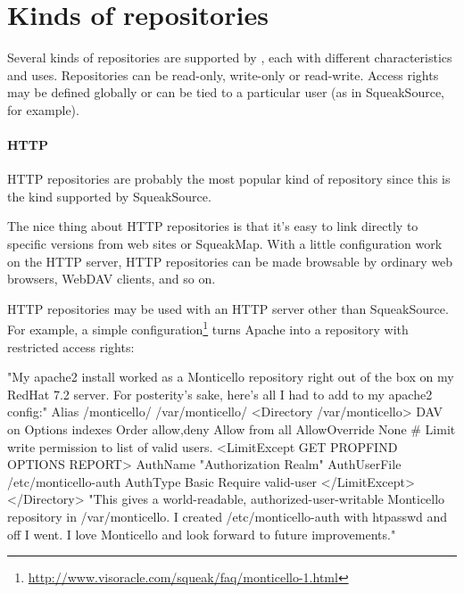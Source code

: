 \documentclass[a4paper,10pt,twoside]{book}
\begin{document}

\section{Kinds of repositories}

Several kinds of repositories are supported by \MC, each with different characteristics and uses. Repositories can be read-only, write-only or read-write. Access rights may be defined globally or can be tied to a particular user (as in SqueakSource, for example).

\paragraph{HTTP} HTTP repositories are probably the most popular kind of repository since this is the kind supported by SqueakSource. %

The nice thing about HTTP repositories is that it's easy to link directly to specific versions from web sites or SqueakMap. With a little configuration work on the HTTP server, HTTP repositories can be made browsable by ordinary web browsers, WebDAV clients, and so on.

HTTP repositories may be used with an HTTP server other than SqueakSource. For example, a simple configuration\footnote{\url{http://www.visoracle.com/squeak/faq/monticello-1.html}} turns Apache into a \MC repository with restricted access rights:

\begin{code}{}
"My apache2 install worked as a Monticello repository right out of the box on my
RedHat 7.2 server.  For posterity's sake, here's all I had to add to my apache2 config:"
Alias /monticello/ /var/monticello/
<Directory /var/monticello>
  DAV on
  Options indexes
  Order allow,deny
  Allow from all
  AllowOverride None
  # Limit write permission to list of valid users.
  <LimitExcept GET PROPFIND OPTIONS REPORT>
    AuthName "Authorization Realm"
    AuthUserFile /etc/monticello-auth
    AuthType Basic
    Require valid-user
  </LimitExcept>
</Directory>
"This gives a world-readable, authorized-user-writable Monticello repository in
/var/monticello.  I created /etc/monticello-auth with htpasswd and off I went.
I love Monticello and look forward to future improvements."
\end{code}
\end{document}
